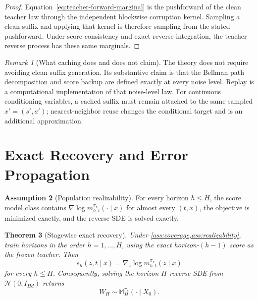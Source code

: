 \documentclass[11pt]{article}
\newtheorem{theorem}{Theorem}
\theoremstyle{definition}
\newtheorem{assumption}[theorem]{Assumption}
\theoremstyle{remark}
\newtheorem{remark}[theorem]{Remark}
\newcommand{\Normal}{\mathcal N}
\newcommand{\score}{s}
\newcommand{\targetpi}{\pi_e}
\begin{document}
\begin{proof}
Equation~\eqref{eq:teacher-forward-marginal} is the pushforward of the clean
teacher law through the independent blockwise corruption kernel. Sampling a
clean suffix and applying that kernel is therefore sampling from the stated
pushforward. Under score consistency and exact reverse integration, the
teacher reverse process has these same marginals.
\end{proof}

\begin{remark}[What caching does and does not claim]
\label{rem:caching-claim}
The theory does not require avoiding clean suffix generation. Its substantive
claim is that the Bellman path decomposition and score backup are defined
exactly at every noise level. Replay is a computational implementation of that
noise-level law. For continuous conditioning variables, a cached suffix must
remain attached to the same sampled $x'=(s',a')$; nearest-neighbor reuse changes
the conditional target and is an additional approximation.
\end{remark}

\section{Exact Recovery and Error Propagation}
\label{sec:theory}

\begin{assumption}[Population realizability]
\label{ass:realizability}
For every horizon $h\leq H$, the score model class contains
$\nabla\log m_{h,t}^{\targetpi}(\cdot\mid x)$ for almost every $(t,x)$, the
objective is minimized exactly, and the reverse SDE is solved exactly.
\end{assumption}

\begin{theorem}[Stagewise exact recovery]
\label{thm:stagewise-recovery}
Under \cref{ass:coverage,ass:realizability}, train horizons in the order
$h=1,\ldots,H$, using the exact horizon-$(h-1)$ score as the frozen teacher.
Then
\begin{equation}
\score_h(z,t\mid x)
=
\nabla_z\log m_{h,t}^{\targetpi}(z\mid x)
\end{equation}
for every $h\leq H$. Consequently, solving the horizon-$H$ reverse SDE from
$\Normal(0,I_{Hd})$ returns
\begin{equation}
\boxed{
W_H
\sim
\mathbb M_H^{\targetpi}(\cdot\mid X_0).
}
\label{eq:direct-generation-law}
\end{equation}
\end{theorem}
\end{document}
